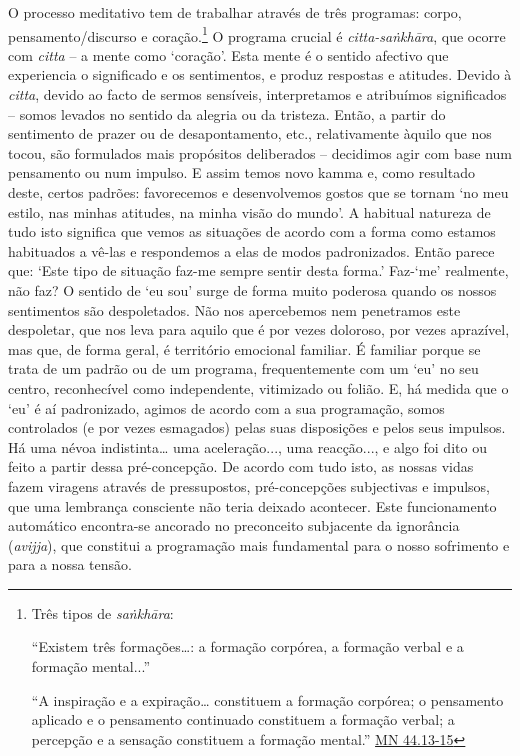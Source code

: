 O processo meditativo tem de trabalhar através de três programas: corpo, pensamento/discurso e coração.\footnote{Três tipos de \emph{saṅkhāra}:

  ``Existem três formações\ldots: a formação corpórea, a formação verbal e a formação mental...''

  ``A inspiração e a expiração\ldots{} constituem a formação corpórea; o pensamento aplicado e o pensamento continuado constituem a formação verbal; a percepção e a sensação constituem a formação mental.'' \href{https://suttacentral.net/mn44/en/sujato}{MN 44.13-15}} O programa crucial é \emph{citta-saṅkhāra}, que ocorre com \emph{citta} -- a mente como `coração'. Esta mente é o sentido afectivo que experiencia o significado e os sentimentos, e produz respostas e atitudes. Devido à \emph{citta}, devido ao facto de sermos sensíveis, interpretamos e atribuímos significados -- somos levados no sentido da alegria ou da tristeza. Então, a partir do sentimento de prazer ou de desapontamento, etc., relativamente àquilo que nos tocou, são formulados mais propósitos deliberados -- decidimos agir com base num pensamento ou num impulso. E assim temos novo kamma e, como resultado deste, certos padrões: favorecemos e desenvolvemos gostos que se tornam `no meu estilo, nas minhas atitudes, na minha visão do mundo'. A habitual natureza de tudo isto significa que vemos as situações de acordo com a forma como estamos habituados a vê-las e respondemos a elas de modos padronizados. Então parece que: `Este tipo de situação faz-me sempre sentir desta forma.' Faz-`me' realmente, não faz? O sentido de `eu sou' surge de forma muito poderosa quando os nossos sentimentos são despoletados. Não nos apercebemos nem penetramos este despoletar, que nos leva para aquilo que é por vezes doloroso, por vezes aprazível, mas que, de forma geral, é território emocional familiar. É familiar porque se trata de um padrão ou de um programa, frequentemente com um `eu' no seu centro, reconhecível como independente, vitimizado ou folião. E, há medida que o `eu' é aí padronizado, agimos de acordo com a sua programação, somos controlados (e por vezes esmagados) pelas suas disposições e pelos seus impulsos. Há uma névoa indistinta\ldots{} uma aceleração..., uma reacção..., e algo foi dito ou feito a partir dessa pré-concepção. De acordo com tudo isto, as nossas vidas fazem viragens através de pressupostos, pré-concepções subjectivas e impulsos, que uma lembrança consciente não teria deixado acontecer. Este funcionamento automático encontra-se ancorado no preconceito subjacente da ignorância (\emph{avijja}), que constitui a programação mais fundamental para o nosso sofrimento e para a nossa tensão.

